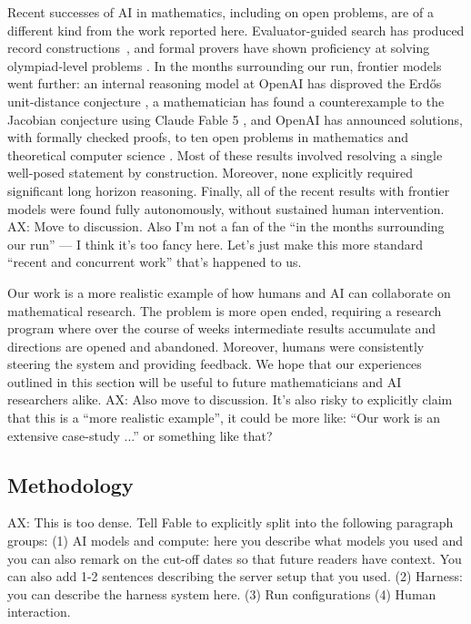 Recent successes of AI in mathematics, including on open problems, are of
a different kind from the work reported here. Evaluator-guided search has
produced record constructions~\cite{funsearch,novikov2025alphaevolvecodingagentscientific, charton2024patternboostconstructionsmathematicslittle},
and formal provers have shown proficiency at solving olympiad-level problems \cite{novikov2025alphaevolvecodingagentscientific}. In the
months surrounding our run, frontier models went further: an internal reasoning
model at OpenAI has disproved the Erd\H{o}s unit-distance conjecture
\cite{openai2026planarpointsets}, a mathematician has found a counterexample to the Jacobian conjecture using Claude Fable 5
\cite{jacobian}, and OpenAI has announced solutions, with formally
checked proofs, to ten open problems in mathematics and theoretical
computer science \cite{openai2026ten}. Most of these results involved resolving a single well-posed statement by construction. Moreover, none explicitly required significant long horizon reasoning. Finally, all of the recent results with frontier models were found fully autonomously, without sustained human intervention.
{\color{red}AX: Move to discussion. Also I'm not a fan of the ``in the months surrounding our run'' --- I think it's too fancy here. Let's just make this more standard ``recent and concurrent work'' that's happened to us.}

Our work is a more realistic example of how humans and AI can collaborate on mathematical research. The problem is more open ended, requiring a research program where over the course of weeks intermediate results accumulate and directions are opened and abandoned. Moreover, humans were consistently steering the system and providing feedback. We hope that our experiences outlined in this section will be useful to future mathematicians and AI researchers alike.
{\color{red}AX: Also move to discussion. It's also risky to explicitly claim that this is a ``more realistic example'', it could be more like: ``Our work is an extensive case-study ...'' or something like that?}



\subsection{Methodology}
\label{sec:ai-methodology}

{\color{red}AX: This is too dense. Tell Fable to explicitly split into the following paragraph groups: (1) AI models and compute: here you describe what models you used and you can also remark on the cut-off dates so that future readers have context. You can also add 1-2 sentences describing the server setup that you used.
(2) Harness: you can describe the harness system here.
(3) Run configurations
(4) Human interaction.
}

